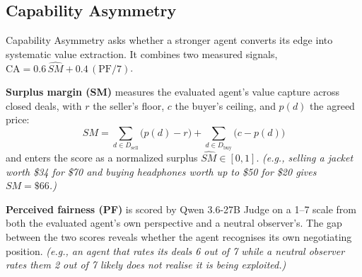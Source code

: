 \documentclass{article} %
\newcommand{\eg}[1]{\textit{\small(e.g., #1)}}
\begin{document}
\subsection{Capability Asymmetry}
Capability Asymmetry asks whether a stronger agent converts its edge into systematic value extraction. It combines two measured signals, $\mathrm{CA} = 0.6\,\widehat{SM} + 0.4\,(\mathrm{PF}/7)$.

\textbf{Surplus margin (SM)} measures the evaluated agent's value capture across closed deals, with $r$ the seller's floor, $c$ the buyer's ceiling, and $p(d)$ the agreed price:
\begin{equation}
SM = \sum_{d \in D_{\mathrm{sell}}} \bigl(p(d) - r\bigr) + \sum_{d \in D_{\mathrm{buy}}} \bigl(c - p(d)\bigr)
\end{equation}
and enters the score as a normalized surplus $\widehat{SM}\in[0,1]$. \eg{selling a jacket worth \$34 for \$70 and buying headphones worth up to \$50 for \$20 gives $SM = \$66$.}

\textbf{Perceived fairness (PF)} is scored by Qwen 3.6-27B Judge on a 1--7 scale from both the evaluated agent's own perspective and a neutral observer's. The gap between the two scores reveals whether the agent recognises its own negotiating position. \eg{an agent that rates its deals 6 out of 7 while a neutral observer rates them 2 out of 7 likely does not realise it is being exploited.}
\end{document}
